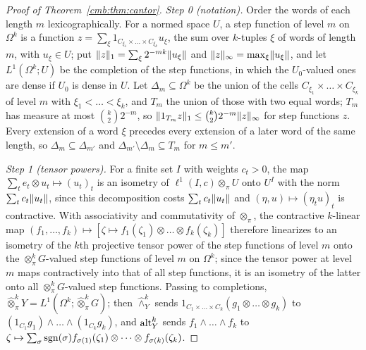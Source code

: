 \begin{proof}[Proof of Theorem~\ref{cmb:thm:cantor}]
\emph{Step 0 (notation).} Order the words of each length $m$ lexicographically. For a normed space $U$, a step function of
level $m$ on $\Omega^k$ is a function $z=\sum_\xi1_{C_{\xi_1}\times\dots\times C_{\xi_k}}u_\xi$, the sum over $k$-tuples
$\xi$ of words of length $m$, with $u_\xi\in U$; put $\lVert z\rVert_1=\sum_\xi2^{-mk}\lVert u_\xi\rVert$ and
$\lVert z\rVert_\infty=\max_\xi\lVert u_\xi\rVert$, and let $L^1(\Omega^k;U)$ be the completion of the step functions, in which the
$U_0$-valued ones are dense if $U_0$ is dense in $U$. Let $\Delta_m\subseteq\Omega^k$ be the union of the cells
$C_{\xi_1}\times\dots\times C_{\xi_k}$ of level $m$ with $\xi_1<\dots<\xi_k$, and $T_m$ the union of those with two equal
words; $T_m$ has measure at most $\binom k22^{-m}$, so $\lVert 1_{T_m}z\rVert_1\le\binom k22^{-m}\lVert z\rVert_\infty$ for step
functions $z$. Every extension of a word $\xi$ precedes every extension of a later word of the same length, so
$\Delta_m\subseteq\Delta_{m'}$ and $\Delta_{m'}\setminus\Delta_m\subseteq T_m$ for $m\le m'$.

\emph{Step 1 (tensor powers).} For a finite set $I$ with weights $c_t>0$, the map $\sum_te_t\otimes u_t\mapsto(u_t)_t$ is
an isometry of $\ell^1(I,c)\otimes_\pi U$ onto $U^I$ with the norm $\sum_tc_t\lVert u_t\rVert$, since this decomposition costs
$\sum_tc_t\lVert u_t\rVert$ and $(\eta,u)\mapsto(\eta_tu)_t$ is contractive. With associativity and commutativity of
$\otimes_\pi$, the contractive $k$-linear map $(f_1,\dots,f_k)\mapsto[\zeta\mapsto f_1(\zeta_1)\otimes\dots\otimes
f_k(\zeta_k)]$ therefore linearizes to an isometry of the $k$th projective tensor power of the step functions of level $m$
onto the $\otimes^k_\pi G$-valued step functions of level $m$ on $\Omega^k$; since the tensor power at level $m$ maps
contractively into that of all step functions, it is an isometry of the latter onto all $\otimes^k_\pi G$-valued step
functions. Passing to completions, $\widehat\otimes^k_\pi Y=L^1(\Omega^k;\widehat\otimes^k_\pi G)$; then
$\widehat\wedge^k_Y$ sends $1_{C_1\times\dots\times C_k}(g_1\otimes\dots\otimes g_k)$ to
$(1_{C_1}g_1)\wedge\dots\wedge(1_{C_k}g_k)$, and $\operatorname{alt}^k_Y$ sends $f_1\wedge\dots\wedge f_k$ to
$\zeta\mapsto\sum_\sigma\operatorname{sgn}(\sigma)f_{\sigma(1)}(\zeta_1)\otimes\dots\otimes f_{\sigma(k)}(\zeta_k)$.


\end{proof}
